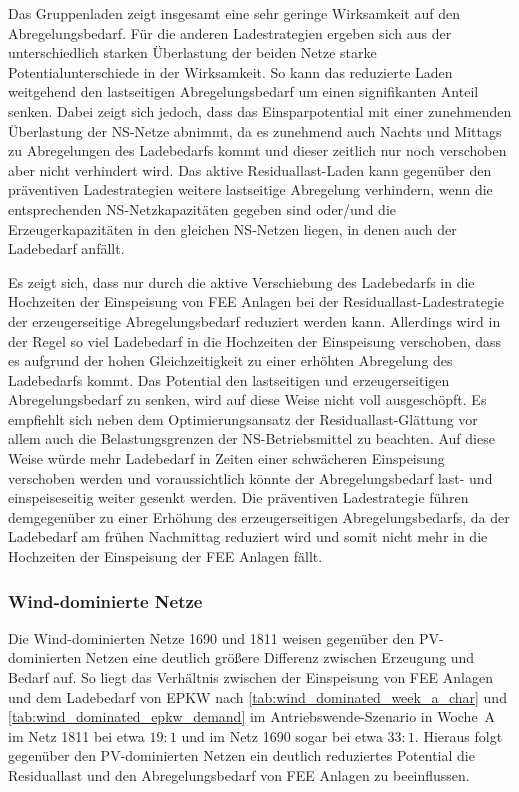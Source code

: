 Das Gruppenladen zeigt insgesamt eine sehr geringe Wirksamkeit auf den Abregelungsbedarf.
Für die anderen Ladestrategien ergeben sich aus der unterschiedlich starken Überlastung der beiden Netze starke Potentialunterschiede in der Wirksamkeit.
So kann das reduzierte Laden weitgehend den lastseitigen Abregelungsbedarf um einen signifikanten Anteil senken.
Dabei zeigt sich jedoch, dass das Einsparpotential mit einer zunehmenden Überlastung der \gls{NS}-Netze abnimmt, da es zunehmend auch Nachts und Mittags zu Abregelungen des Ladebedarfs kommt und dieser zeitlich nur noch verschoben aber nicht verhindert wird.
Das aktive Residuallast-Laden kann gegenüber den präventiven Ladestrategien weitere lastseitige Abregelung verhindern, wenn die entsprechenden \gls{NS}-Netzkapazitäten gegeben sind oder/und die Erzeugerkapazitäten in den gleichen \gls{NS}-Netzen liegen, in denen auch der Ladebedarf anfällt.\medskip

Es zeigt sich, dass nur durch die aktive Verschiebung des Ladebedarfs in die Hochzeiten der Einspeisung von \gls{FEE} Anlagen bei der Residuallast-Ladestrategie der erzeugerseitige Abregelungsbedarf reduziert werden kann.
Allerdings wird in der Regel so viel Ladebedarf in die Hochzeiten der Einspeisung verschoben, dass es aufgrund der hohen Gleichzeitigkeit zu einer erhöhten Abregelung des Ladebedarfs kommt.
Das Potential den lastseitigen und erzeugerseitigen Abregelungsbedarf zu senken, wird auf diese Weise nicht voll ausgeschöpft.
Es empfiehlt sich neben dem Optimierungsansatz der Residuallast-Glättung vor allem auch die Belastungsgrenzen der \gls{NS}-Betriebsmittel zu beachten.
Auf diese Weise würde mehr Ladebedarf in Zeiten einer schwächeren Einspeisung verschoben werden und voraussichtlich könnte der Abregelungsbedarf last- und einspeiseseitig weiter gesenkt werden.
Die präventiven Ladestrategie führen demgegenüber zu einer Erhöhung des erzeugerseitigen Abregelungsbedarfs, da der Ladebedarf am frühen Nachmittag reduziert wird und somit nicht mehr in die Hochzeiten der Einspeisung der \gls{FEE} Anlagen fällt.


\subsubsection{Wind-dominierte Netze}\label{chap:wind_cur_results}

Die Wind-dominierten Netze \num{1690} und \num{1811} weisen gegenüber den \gls{PV}-dominierten Netzen eine deutlich größere Differenz zwischen Erzeugung und Bedarf auf.
So liegt das Verhältnis zwischen der Einspeisung von \gls{FEE} Anlagen und dem Ladebedarf von \gls{EPKW} nach \autoref{tab:wind_dominated_week_a_char} und \autoref{tab:wind_dominated_epkw_demand} im Antriebswende-Szenario in Woche~A im Netz \num{1811} bei etwa \(19:1\) und im Netz \num{1690} sogar bei etwa \(33:1\).
Hieraus folgt gegenüber den \gls{PV}-dominierten Netzen ein deutlich reduziertes Potential die Residuallast und den Abregelungsbedarf von \gls{FEE} Anlagen zu beeinflussen.

